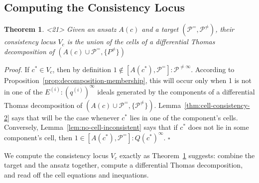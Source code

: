 \documentclass{article}
\newtheorem{theorem}{Theorem}
\theoremstyle{definition}
\theoremstyle{plain}
\newcommand{\qedbox}{\hspace*{\fill}\ensuremath{\square}}
\begin{document}
\vfill\eject
\subsection{Computing the Consistency Locus}
\label{sec:consistency-locus}

\begin{theorem}<21>
\label{thm:correctness-consistency}
Given an ansatz $A(c)$ and a target $(\mathcal{P}^=, \mathcal{P}^{\ne})$,
their consistency locus $V_c$ is the union of the cells
of a differential Thomas decomposition of $(A(c) \cup \mathcal{P}^=, \{P^{\ne}\})$
\end{theorem}

{\it Proof.}
If $c^* \in V_c$, then by definition $1 \notin [A(c^*), \mathcal{P}^=]: \mathcal{P}^{\ne\infty}$.
According to Proposition~\ref{prop:decomposition-membership},
this will occur only when 1 is not in one of the
$E^{(i)} : (q^{(i)})^\infty$ ideals generated by the components
of a differential Thomas decomposition of $(A(c) \cup \mathcal{P}^=, \{\mathcal{P}^{\ne}\})$.
Lemma~\ref{thm:cell-consistency-2} says that will be the case whenever $c^*$ lies in one of the component's cells.
Conversely, Lemma~\ref{lem:no-cell-inconsistent} says that if $c^*$ does not lie in some component's cell,
then $1 \in [A(c^*), \mathcal{P}^=] : Q(c^*)^\infty$.
\qedbox

We compute the consistency locus $V_c$ exactly
as Theorem~\ref{thm:correctness-consistency} suggests: combine the target and the ansatz together,
compute a differential Thomas decomposition, and read off the cell equations and inequations.
\end{document}

